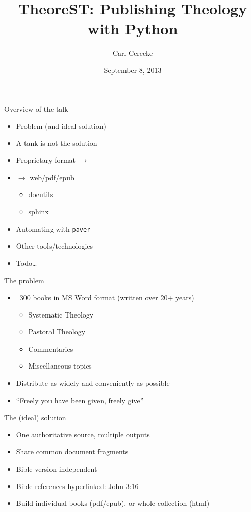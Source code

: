 \documentclass{beamer}
\title{TheoreST: Publishing Theology with Python}
\author{Carl Cerecke}
\institute{Evangelical Bible College of Western Australia}
\date{September 8, 2013}
\begin{document}
    
    \begin{frame}[plain]
        \titlepage
    \end{frame}

    \begin{frame}{Overview of the talk}
        \begin{itemize}
        \item Problem (and ideal solution)
        \item A tank is not the solution
        \item Proprietary format $\rightarrow$ \rst
        \item \rst $\rightarrow$ web/pdf/epub
            \begin{itemize}
            \item docutils
            \item sphinx
            \end{itemize}
        \item Automating with \texttt{paver}
        \item Other tools/technologies
        \item Todo\ldots
        \end{itemize}
    \end{frame}
    
    \begin{frame}{The problem}
        \begin{itemize}
        \item ~300 books in MS Word format (written over 20+ years)
            \begin{itemize}
            \item Systematic Theology
            \item Pastoral Theology
            \item Commentaries
            \item Miscellaneous topics 
            \end{itemize}
        \item Distribute as widely and conveniently as possible
        \item ``Freely you have been given, freely give''
        \end{itemize}
    \end{frame}
    
    \begin{frame}{The (ideal) solution}
        \begin{itemize}
        \item One authoritative source, multiple outputs
        \item Share common document fragments
        \item Bible version independent
        \item Bible references hyperlinked: \href{http://some.url}{John 3:16}
        \item Build individual books (pdf/epub), or whole collection (html)
    \end{itemize}
\end{frame}
    
\end{document}
